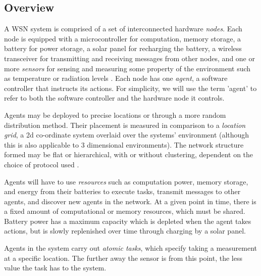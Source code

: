 \subsection{Overview}
\label{problem_overview}
A WSN system is comprised of a set of interconnected hardware \textit{nodes}. Each node is equipped with a microcontroller for computation, memory storage, a battery for power storage, a solar panel for recharging the battery, a wireless transceiver for  transmitting and receiving messages from other nodes, and one or more \textit{sensors} for sensing and measuring some property of the environment such as temperature or radiation levels \citep{muhammad_r_ahmed_2012_1072589}. Each node has one \textit{agent}, a software controller that instructs its actions. For simplicity, we will use the term 'agent' to refer to both the software controller and the hardware node it controls. 

Agents may be deployed to precise locations or through a more random distribution method. Their placement is measured in comparison to a \textit{location grid}, a 2d co-ordinate system overlaid over the systems' environment (although this is also applicable to 3 dimensional environments).  The network structure formed may be flat or hierarchical, with or without clustering, dependent on the choice of protocol used \citep{Carlos-Mancilla2016b}. 

Agents will have to use \textit{resources} such as computation power, memory storage, and energy from their batteries to execute tasks, transmit messages to other agents, and discover new agents in the network. At a given point in time, there is a fixed amount of computational or memory resources, which must be shared. Battery power has a maximum capacity which is depleted when the agent takes actions, but is slowly replenished over time through charging by a solar panel.  

Agents in the system carry out \textit{atomic tasks}, which specify taking a measurement at a specific location. The further away the sensor is from this point, the less value the task has to the system.

